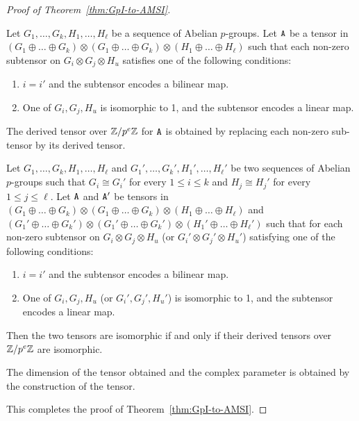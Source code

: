\begin{proof}[Proof of Theorem~\ref{thm:GpI-to-AMSI}]
\begin{definition}
Let $G_1, \dots, G_k, H_1, \dots, H_\ell$ be a sequence of Abelian $p$-groups. 
Let $\mathtt{A}$ be a tensor in %
$(G_1 \oplus \dots \oplus G_k) \otimes (G_1 \oplus \dots \oplus G_k)  \otimes (H_1 \oplus \dots \oplus H_\ell)$ such that each non-zero subtensor on $G_i \otimes G_{j} \otimes H_u$ satisfies one of the following conditions:
\begin{enumerate}
\item $i = i'$ and the subtensor encodes a bilinear map. 
\item One of $G_i, G_j, H_u$ is isomorphic to 1, and the subtensor encodes a linear map. 
\end{enumerate}
The derived tensor over $\mathbb{Z} / p^e \mathbb{Z}$ for $\mathtt{A}$ is obtained by replacing each non-zero sub-tensor by its derived tensor. 
\end{definition}

\begin{corollary}
Let $G_1, \dots, G_k, H_1, \dots, H_\ell$ and $G_1', \dots, G_k', H_1', \dots, H_\ell'$ be two sequences of Abelian $p$-groups such that $G_i \cong G_i'$ for every $1\leq i\leq k$ and $H_j \cong H_j'$ for every $1 \leq j \leq \ell$. 
Let $\mathtt{A}$ and $\mathtt{A}'$ be tensors in $(G_1 \oplus \dots \oplus G_k) \otimes (G_1 \oplus \dots \oplus G_k)  \otimes (H_1 \oplus \dots \oplus H_\ell)$ and  $(G_1' \oplus \dots \oplus G_k') \otimes (G_1' \oplus \dots \oplus G_k')  \otimes (H_1' \oplus \dots \oplus H_\ell')$ such that for each non-zero subtensor on $G_i \otimes G_{j} \otimes H_u$ (or $G_i' \otimes G_{j}' \otimes H_u'$) satisfying one of the following conditions:
\begin{enumerate}
\item $i = i'$ and the subtensor encodes a bilinear map. 
\item One of $G_i, G_j, H_u$ (or $G_i', G_j', H_u'$) is isomorphic to 1, and the subtensor encodes a linear map. 
\end{enumerate}
Then the two tensors are isomorphic if and only if their derived tensors over $\mathbb{Z} / p^e \mathbb{Z}$ are isomorphic.  
\end{corollary}

The dimension of the tensor obtained and the complex parameter is obtained by the construction of the tensor.%

This completes the proof of Theorem~\ref{thm:GpI-to-AMSI}.
\end{proof}






